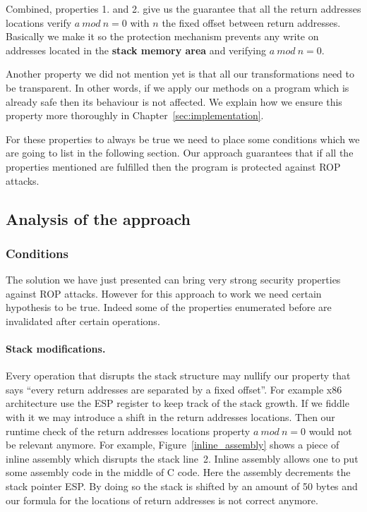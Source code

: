\documentclass[11pt]{sdm}
\begin{document}
Combined, properties 1. and 2. give us the guarantee that all the return addresses locations verify $a~mod~n=0$ with $n$ the fixed offset between return addresses.
Basically we make it so the protection mechanism prevents any write on addresses located in the \textbf{stack memory area} and verifying $a~mod~n=0$.

\hfill \break 
Another property we did not mention yet is that all our transformations need to be transparent. In other words, if we apply our methods on a program which is already safe then its behaviour is not affected. We explain how we ensure this property more thoroughly in Chapter~\ref{sec:implementation}.

\hfill \break 
For these properties to always be true we need to place some conditions which we are going to list in the following section. Our approach guarantees that if all the properties mentioned are fulfilled then the program is protected against ROP attacks.

\subsection{Analysis of the approach}
\label{sub:Analysis of the approach}

\subsubsection{Conditions}
\label{ssub:Conditions}

The solution we have just presented can bring very strong security properties against ROP attacks. However for this approach to work we need certain hypothesis to be true. Indeed some of the properties enumerated before are invalidated after certain operations.

\paragraph{Stack modifications.}
\label{par:Stack modifications}
Every operation that disrupts the stack structure may nullify our property that says ``every return addresses are separated by a fixed offset''. For example x86 architecture use the ESP register to keep track of the stack growth. If we fiddle with it we may introduce a shift in the return addresses locations. Then our runtime check of the return addresses locations property $a~mod~n=0$ would not be relevant anymore.
		For example, Figure~\ref{inline_assembly} shows a piece of inline assembly which disrupts the stack line~2. Inline assembly allows one to put some assembly code in the middle of C code. Here the assembly decrements the stack pointer ESP. By doing so the stack is shifted by an amount of 50 bytes and our formula for the locations of return addresses is not correct anymore.
\end{document}
